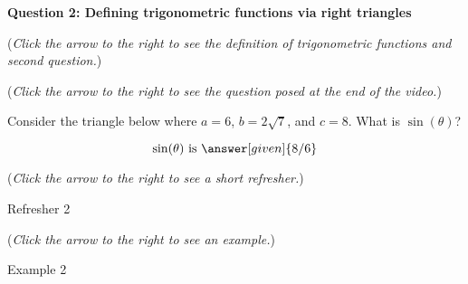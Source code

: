 \documentclass{ximera}
\begin{document}
\textbf{Question 2: Defining trigonometric functions via right triangles}
\begin{question}
\begin{flushright}
{\color{blue}(\emph{Click the arrow to the right to see the definition
of trigonometric functions and second question.})}
\end{flushright}
\begin{center}
\begin{expandable}
{\color{blue}(\emph{Click the arrow to the right to see the question
posed at the end of the video.})}
\begin{expandable}
\begin{center}
\end{center}
Consider the triangle below where $a = 6$, $b=2\sqrt{7}$,
and $c=8$. What is $\sin( \theta)$?\\
\begin{prompt}
\[
\sin(\theta)\text{ is }\answer[given]{8/6}
\]
\end{prompt}
\begin{flushright}
{\color{blue}(\emph{Click the arrow to the right to see a short refresher.})}
\end{flushright}
\begin{expandable}
Refresher 2
\end{expandable}
\begin{flushright}
{\color{blue}(\emph{Click the arrow to the right to see an example.})}
\end{flushright}
\begin{expandable}
Example 2
\end{expandable}
\end{expandable}
\end{expandable}
\end{center}
\end{question}
\end{document}
